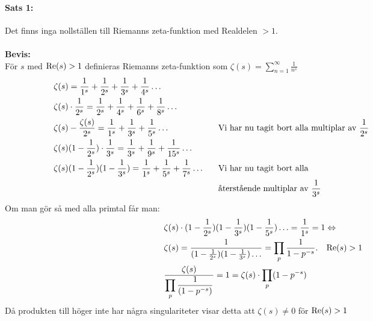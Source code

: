 \documentclass[a4paper]{article}%
\begin{document}
\paragraph{Sats 1:}
Det finns inga nollställen till Riemanns zeta-funktion med Realdelen $> 1$.\\
\\
{\bf Bevis:} \\
För $s$ med $\operatorname{Re}(s) > 1$ definieras Riemanns zeta-funktion som 
$\zeta(s) = \sum\limits_{n = 1}^\infty \frac {1} {n^s}$ 
\begin{equation}
	\begin{aligned}
		&\zeta(s) = \frac 1 {1^s} + \frac 1 {2^s} + \frac 1 {3^s} + \frac 1 {4^s} \ldots \notag\\
		&\zeta(s) \cdot \frac 1 {2^s} = \frac 1 {2^s} + \frac 1 {4^s} + \frac 1 {6^s} + \frac 1 {8^s} \ldots \\
		&\zeta(s) - \frac {\zeta(s)} {2^s} = \frac 1 {1^s} + \frac 1 {3^s} + \frac 1 {5^s} \ldots &
		\hspace{\width} &\text{Vi har nu tagit bort alla multiplar av } \frac 1 {2^s} \\
		&\zeta(s) (1 - \frac 1 {2^s}) \cdot \frac 1 {3^s} = \frac 1 {3^s} + \frac 1 {9^s} + \frac 1 {15^s} \ldots\\
		&\zeta(s)(1 - \frac 1 {2^s})(1 - \frac 1 {3^s}) = \frac 1 {1^s} + \frac 1 {5^s} + \frac 1 {7^s} \ldots &
		\hspace{\width} &\text{Vi har nu tagit bort alla} \\
		& & \hspace{\width} &\text{återstående multiplar av } \frac 1 {3^s} \\
	\end{aligned}
	\phantom{\hspace{4cm}}
\end{equation}
Om man gör så med alla primtal får man: 
\begin{equation}
	\begin{aligned}
		\notag
		&\zeta(s) \cdot (1 - \frac 1 {2^s})(1 - \frac 1 {3^s})(1 - \frac 1 {5^s}) \ldots = \frac 1 {1^s} = 1 \Leftrightarrow \\  
		&\zeta(s)  = \frac 1 {(1 - \frac 1 {2^s})(1 - \frac 1 {3^s})\ldots} = \prod_p \frac 1 {1 - p^{-s}}.\hspace{3mm} \operatorname{Re}(s) > 1 \\
		&\frac {\zeta(s)} {\displaystyle\prod_p \frac 1 {(1 - p^{-s})}} = 1 = \zeta(s) \cdot \prod_p (1 - p^{-s}) \\
	\end{aligned}
\end{equation}
Då produkten till höger inte har några singulariteter visar detta att $\zeta(s) \ne 0$ för $\operatorname{Re}(s) > 1$
\end{document}
